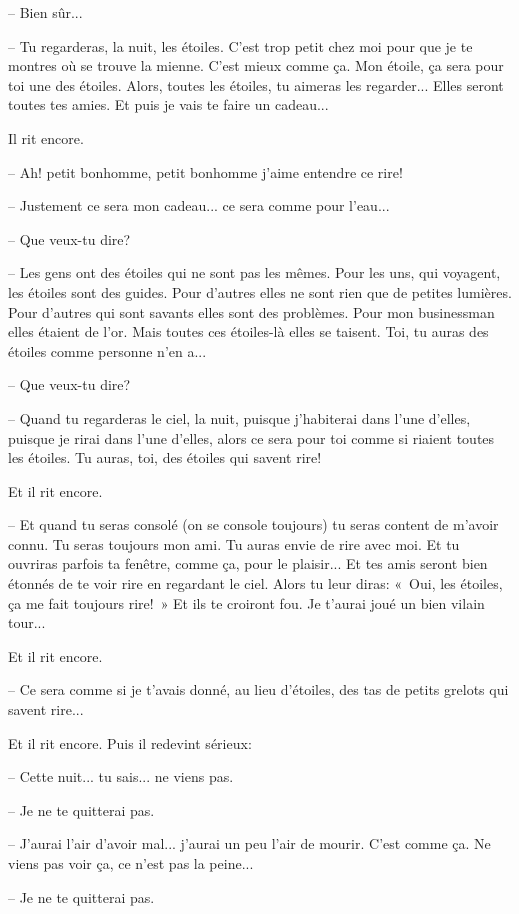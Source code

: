 \documentclass[a4paper]{report}
\begin{document}
-- Bien sûr...

-- Tu regarderas, la nuit, les étoiles. C'est trop petit chez moi pour que je te montres où se trouve la mienne. C'est mieux comme ça. Mon étoile, ça sera pour toi une des étoiles. Alors, toutes les étoiles, tu aimeras les regarder... Elles seront toutes tes amies. Et puis je vais te faire un cadeau...

Il rit encore.

-- Ah! petit bonhomme, petit bonhomme j'aime entendre ce rire!

-- Justement ce sera mon cadeau... ce sera comme pour l'eau...

-- Que veux-tu dire?

-- Les gens ont des étoiles qui ne sont pas les mêmes. Pour les uns, qui voyagent, les étoiles sont des guides. Pour d'autres elles ne sont rien que de petites lumières. Pour d'autres qui sont savants elles sont des problèmes. Pour mon businessman elles étaient de l'or. Mais toutes ces étoiles-là elles se taisent. Toi, tu auras des étoiles comme personne n'en a...

-- Que veux-tu dire?

-- Quand tu regarderas le ciel, la nuit, puisque j'habiterai dans l'une d'elles, puisque je rirai dans l'une d'elles, alors ce sera pour toi comme si riaient toutes les étoiles. Tu auras, toi, des étoiles qui savent rire!

Et il rit encore.

-- Et quand tu seras consolé (on se console toujours) tu seras content de m'avoir connu. Tu seras toujours mon ami. Tu auras envie de rire avec moi. Et tu ouvriras parfois ta fenêtre, comme ça, pour le plaisir... Et tes amis seront bien étonnés de te voir rire en regardant le ciel. Alors tu leur diras: «~Oui, les étoiles, ça me fait toujours rire!~» Et ils te croiront fou. Je t'aurai joué un bien vilain tour...

Et il rit encore.

-- Ce sera comme si je t'avais donné, au lieu d'étoiles, des tas de petits grelots qui savent rire...

Et il rit encore. Puis il redevint sérieux:

-- Cette nuit... tu sais... ne viens pas.

-- Je ne te quitterai pas.

-- J'aurai l'air d'avoir mal... j'aurai un peu l'air de mourir. C'est comme ça. Ne viens pas voir ça, ce n'est pas la peine...

-- Je ne te quitterai pas.
\end{document}

